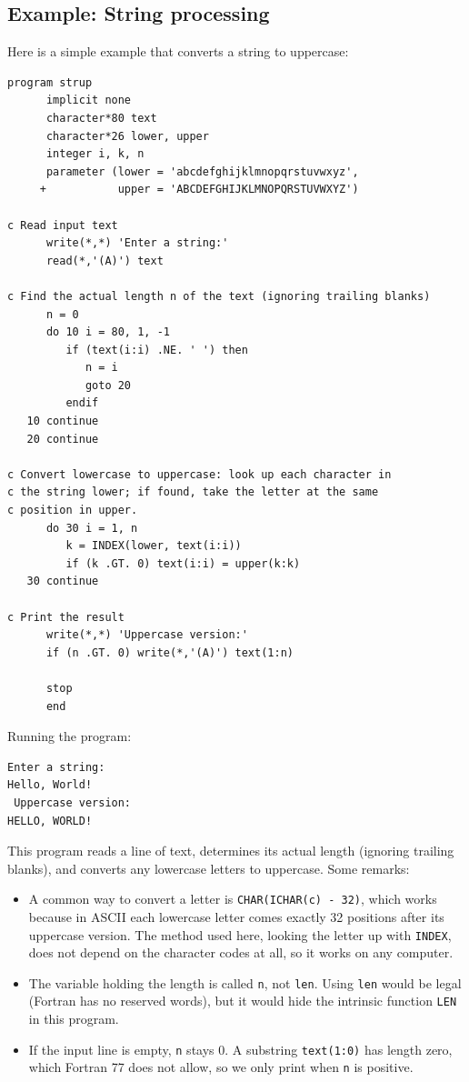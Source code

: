 \subsection{Example: String processing}
\label{sec:strup}

Here is a simple example that converts a string to uppercase:

\begin{lstlisting}[style=fortran77]
      program strup
      implicit none
      character*80 text
      character*26 lower, upper
      integer i, k, n
      parameter (lower = 'abcdefghijklmnopqrstuvwxyz',
     +           upper = 'ABCDEFGHIJKLMNOPQRSTUVWXYZ')

c Read input text
      write(*,*) 'Enter a string:'
      read(*,'(A)') text

c Find the actual length n of the text (ignoring trailing blanks)
      n = 0
      do 10 i = 80, 1, -1
         if (text(i:i) .NE. ' ') then
            n = i
            goto 20
         endif
   10 continue
   20 continue

c Convert lowercase to uppercase: look up each character in
c the string lower; if found, take the letter at the same
c position in upper.
      do 30 i = 1, n
         k = INDEX(lower, text(i:i))
         if (k .GT. 0) text(i:i) = upper(k:k)
   30 continue

c Print the result
      write(*,*) 'Uppercase version:'
      if (n .GT. 0) write(*,'(A)') text(1:n)

      stop
      end
\end{lstlisting}

Running the program:

\begin{lstlisting}[style=output]
 Enter a string:
Hello, World!
 Uppercase version:
HELLO, WORLD!
\end{lstlisting}

This program reads a line of text, determines its actual length (ignoring trailing blanks), and converts any lowercase letters to uppercase. Some remarks:

\begin{itemize}
    \item A common way to convert a letter is \texttt{CHAR(ICHAR(c) - 32)}, which works because in ASCII each lowercase letter comes exactly 32 positions after its uppercase version. The method used here, looking the letter up with \texttt{INDEX}, does not depend on the character codes at all, so it works on any computer.
    \item The variable holding the length is called \texttt{n}, not \texttt{len}. Using \texttt{len} would be legal (Fortran has no reserved words), but it would hide the intrinsic function \texttt{LEN} in this program.
    \item If the input line is empty, \texttt{n} stays 0. A substring \texttt{text(1:0)} has length zero, which Fortran 77 does not allow, so we only print when \texttt{n} is positive.
\end{itemize}

